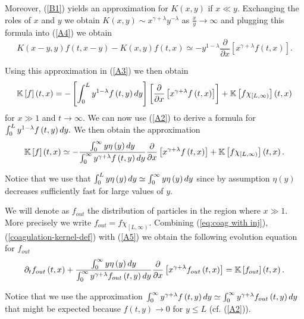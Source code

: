 \documentclass[11pt]{article}
\numberwithin{equation}{section}
\theoremstyle{plain}
\newcommand{\der}{\textup{d}}
\begin{document}
Moreover, (\ref{B1}) yields an approximation for $K\left(  x,y\right)  $ if
$x\ll y.$ Exchanging the roles of $x$ and $y$ we obtain $K\left(  x,y\right)
\sim x^{\gamma+\lambda}y^{-\lambda}$ as $\frac{x}{y}\rightarrow\infty$ and
plugging this formula into (\ref{A4}) we obtain%
\[
K\left(  x-y,y\right)  f\left(  t,x-y\right)  -K\left(  x,y\right)  f\left(
t,x\right)  \simeq-y^{1-\lambda}\frac{\partial}{\partial x}\left[
x^{\gamma+\lambda}f\left(  t,x\right)  \right].
\]


Using this approximation in (\ref{A3}) we then obtain%
\[
\mathbb{K}\left[  f\right]  \left(  t,x\right)  =-\left[  \int_{0}%
^{L}y^{1-\lambda}f\left(  t,y\right)  \der y\right]  \left[  \frac{\partial
}{\partial x}\left[  x^{\gamma+\lambda}f\left(  t,x\right)  \right]  \right]
+\mathbb{K}\left[  f\chi_{\left[  L,\infty\right)  }\right]  \left(
t,x\right)
\]
for $x\gg1$ and $t\rightarrow\infty.$ We can now use (\ref{A2}) to derive a
formula for $\int_{0}^{L}y^{1-\lambda}f\left(  t,y\right)  \der y.$
We then obtain the approximation%
\begin{equation}
\mathbb{K}\left[  f\right]  \left(  t,x\right)  \simeq -\frac{\int_{0}^{\infty}%
y\eta\left(  y\right)  \der y}{\int_{0}^{\infty}y^{\gamma+\lambda}f\left(
t,y\right)  \der y}\frac{\partial}{\partial x}\left[  x^{\gamma+\lambda}f\left(
t,x\right)  \right]  +\mathbb{K}\left[  f\chi_{\left[  L,\infty\right)
}\right]  \left(  t,x\right).  \label{A5}%
\end{equation}


Notice that we use that $\int_{0}^{L}y\eta\left(  y\right)  \der y\simeq\int
_{0}^{\infty}y\eta\left(  y\right) \der y$ since by assumption $\eta\left(
y\right)  $ decreases sufficiently fast for large values of $y.$

We will denote as $f_{out}$ the distribution of particles in the region where
$x\gg1.$ More precisely we write $f_{out}=f\chi_{\left[  L,\infty\right)  }.$
Combining (\ref{eq:coag with inj}), (\ref{coagulation-kernel-def}) with (\ref{A5}) we obtain
the following evolution equation for $f_{out}$%
\begin{equation}
\partial_{t}f_{out}\left(  t,x\right)  +\frac{\int_{0}^{\infty}y\eta\left(
y\right)  \der y}{\int_{0}^{\infty}y^{\gamma+\lambda}f_{out}\left(  t,y\right)
\der y}\frac{\partial}{\partial x}\left[  x^{\gamma+\lambda}f_{out}\left(
t,x\right)  \right]  =\mathbb{K}\left[  f_{out}\right]  \left(  t,x\right).
\label{A6}%
\end{equation}

Notice that we use the approximation $\int_{0}^{\infty}y^{\gamma+\lambda
}f\left(  t,y\right)  \der y\simeq\int_{0}^{\infty}y^{\gamma+\lambda}%
f_{out}\left(  t,y\right)  \der y$ that might be expected because $f\left(
t,y\right)  \rightarrow0$ for $y\leq L$ (cf. (\ref{A2})).
\end{document}
